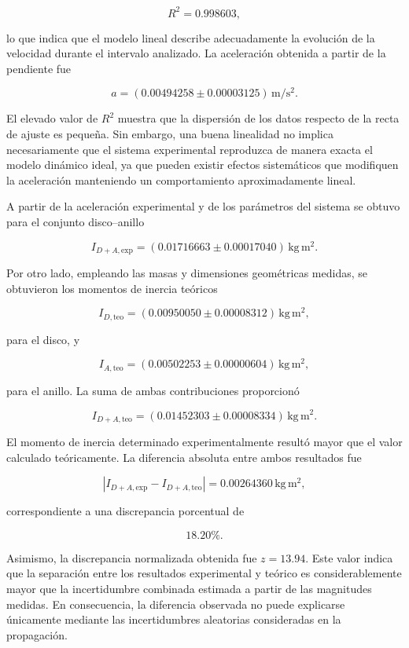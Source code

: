 \documentclass[11pt,a4paper]{article}
\begin{document}
\[
R^2=0.998603,
\]

lo que indica que el modelo lineal describe adecuadamente la evolución
de la velocidad durante el intervalo analizado. La aceleración obtenida
a partir de la pendiente fue

\[
a=(0.00494258\pm0.00003125)\,\mathrm{m/s^2}.
\]

El elevado valor de \(R^2\) muestra que la dispersión de los datos
respecto de la recta de ajuste es pequeña. Sin embargo, una buena
linealidad no implica necesariamente que el sistema experimental
reproduzca de manera exacta el modelo dinámico ideal, ya que pueden
existir efectos sistemáticos que modifiquen la aceleración manteniendo
un comportamiento aproximadamente lineal.

A partir de la aceleración experimental y de los parámetros del sistema
se obtuvo para el conjunto disco--anillo

\[
I_{D+A,\mathrm{exp}}
=
(0.01716663\pm0.00017040)\,\mathrm{kg\,m^2}.
\]

Por otro lado, empleando las masas y dimensiones geométricas medidas, se
obtuvieron los momentos de inercia teóricos

\[
I_{D,\mathrm{teo}}
=
(0.00950050\pm0.00008312)\,\mathrm{kg\,m^2},
\]

para el disco, y

\[
I_{A,\mathrm{teo}}
=
(0.00502253\pm0.00000604)\,\mathrm{kg\,m^2},
\]

para el anillo. La suma de ambas contribuciones proporcionó

\[
I_{D+A,\mathrm{teo}}
=
(0.01452303\pm0.00008334)\,\mathrm{kg\,m^2}.
\]

El momento de inercia determinado experimentalmente resultó mayor que
el valor calculado teóricamente. La diferencia absoluta entre ambos
resultados fue

\[
\left|
I_{D+A,\mathrm{exp}}-I_{D+A,\mathrm{teo}}
\right|
=
0.00264360\,\mathrm{kg\,m^2},
\]

correspondiente a una discrepancia porcentual de

\[
18.20\%.
\]

Asimismo, la discrepancia normalizada obtenida fue \(z=13.94\). Este
valor indica que la separación entre los resultados experimental y
teórico es considerablemente mayor que la incertidumbre combinada
estimada a partir de las magnitudes medidas. En consecuencia, la
diferencia observada no puede explicarse únicamente mediante las
incertidumbres aleatorias consideradas en la propagación.
\end{document}
